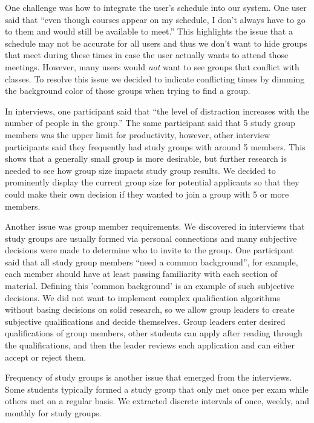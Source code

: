 \documentclass[conference]{IEEEtran}
\begin{document}
One challenge was how to integrate the user's schedule into our system.
One user said that ``even though courses appear on my schedule, I don't always have to go to them and would still be available to meet.''
This highlights the issue that a schedule may not be accurate for all users and thus we don't want to hide groups that meet during these times in case the user actually wants to attend those meetings.
However, many users would \emph{not} want to see groups that conflict with classes.
To resolve this issue we decided to indicate conflicting times by dimming the background color of those groups when trying to find a group.


In interviews, one participant said that ``the level of distraction increases with the number of people in the group.''
The same participant said that 5 study group members was the upper limit for productivity, however, other interview participants said they frequently had study groups with around 5 members.
This shows that a generally small group is more desirable, but further research is needed to see how group size impacts study group results.
We decided to prominently display the current group size for potential applicants so that they could make their own decision if they wanted to join a group with 5 or more members.

Another issue was group member requirements.
We discovered in interviews that study groups are usually formed via personal connections and many subjective decisions were made to determine who to invite to the group.
One participant said that all study group members ``need a common background'', for example, each member should have at least passing familiarity with each section of material.
Defining this 'common background' is an example of such subjective decisions.
We did not want to implement complex qualification algorithms without basing decisions on solid research, so we allow group leaders to create subjective qualifications and decide themselves.
Group leaders enter desired qualifications of group members, other students can apply after reading through the qualifications, and then the leader reviews each application and can either accept or reject them.


Frequency of study groups is another issue that emerged from the interviews.
Some students typically formed a study group that only met once per exam while others met on a regular basis.
We extracted discrete intervals of once, weekly, and monthly for study groups.
\end{document}
